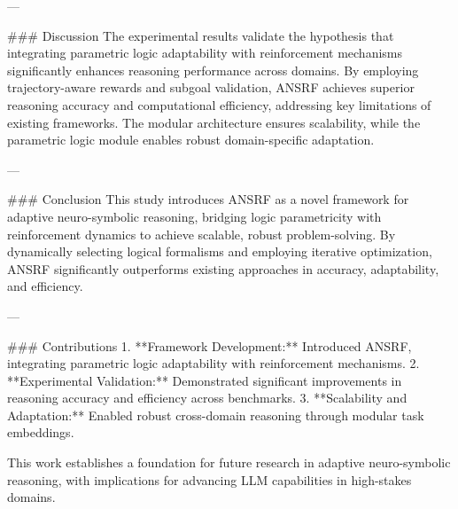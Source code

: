 ---

### Discussion  
The experimental results validate the hypothesis that integrating parametric logic adaptability with reinforcement mechanisms significantly enhances reasoning performance across domains. By employing trajectory-aware rewards and subgoal validation, ANSRF achieves superior reasoning accuracy and computational efficiency, addressing key limitations of existing frameworks. The modular architecture ensures scalability, while the parametric logic module enables robust domain-specific adaptation.

---

### Conclusion  
This study introduces ANSRF as a novel framework for adaptive neuro-symbolic reasoning, bridging logic parametricity with reinforcement dynamics to achieve scalable, robust problem-solving. By dynamically selecting logical formalisms and employing iterative optimization, ANSRF significantly outperforms existing approaches in accuracy, adaptability, and efficiency.

---

### Contributions  
1. **Framework Development:** Introduced ANSRF, integrating parametric logic adaptability with reinforcement mechanisms.  
2. **Experimental Validation:** Demonstrated significant improvements in reasoning accuracy and efficiency across benchmarks.  
3. **Scalability and Adaptation:** Enabled robust cross-domain reasoning through modular task embeddings.  

This work establishes a foundation for future research in adaptive neuro-symbolic reasoning, with implications for advancing LLM capabilities in high-stakes domains.